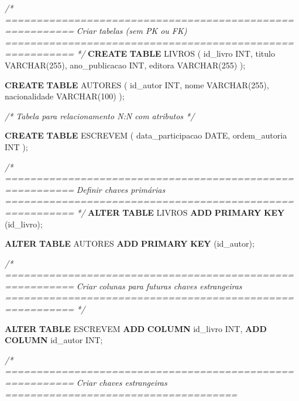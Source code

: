 \documentclass[
]{book}
\newenvironment{Shaded}{\begin{snugshade}}{\end{snugshade}}
\newcommand{\CommentTok}[1]{\textcolor[rgb]{0.56,0.35,0.01}{\textit{#1}}}
\newcommand{\DataTypeTok}[1]{\textcolor[rgb]{0.13,0.29,0.53}{#1}}
\newcommand{\DecValTok}[1]{\textcolor[rgb]{0.00,0.00,0.81}{#1}}
\newcommand{\KeywordTok}[1]{\textcolor[rgb]{0.13,0.29,0.53}{\textbf{#1}}}
\newcommand{\NormalTok}[1]{#1}
\begin{document}
\begin{Shaded}
\begin{Highlighting}[]

\CommentTok{/* =========================================================}
\CommentTok{   Criar tabelas (sem PK ou FK)}
\CommentTok{   ========================================================= */}
\KeywordTok{CREATE} \KeywordTok{TABLE}\NormalTok{ LIVROS }
\NormalTok{(}
\NormalTok{    id\_livro }\DataTypeTok{INT}\NormalTok{,}
\NormalTok{    titulo }\DataTypeTok{VARCHAR}\NormalTok{(}\DecValTok{255}\NormalTok{),}
\NormalTok{    ano\_publicacao }\DataTypeTok{INT}\NormalTok{,}
\NormalTok{    editora }\DataTypeTok{VARCHAR}\NormalTok{(}\DecValTok{255}\NormalTok{)}
\NormalTok{);}

\KeywordTok{CREATE} \KeywordTok{TABLE}\NormalTok{ AUTORES }
\NormalTok{(}
\NormalTok{    id\_autor }\DataTypeTok{INT}\NormalTok{,}
\NormalTok{    nome }\DataTypeTok{VARCHAR}\NormalTok{(}\DecValTok{255}\NormalTok{),}
\NormalTok{    nacionalidade }\DataTypeTok{VARCHAR}\NormalTok{(}\DecValTok{100}\NormalTok{)}
\NormalTok{);}

\CommentTok{/* Tabela para relacionamento N:N com atributos */}

\KeywordTok{CREATE} \KeywordTok{TABLE}\NormalTok{ ESCREVEM }
\NormalTok{(}
\NormalTok{    data\_participacao }\DataTypeTok{DATE}\NormalTok{,}
\NormalTok{    ordem\_autoria }\DataTypeTok{INT}
\NormalTok{);}

\CommentTok{/* =========================================================}
\CommentTok{   Definir chaves primárias}
\CommentTok{   ========================================================= */}
\KeywordTok{ALTER} \KeywordTok{TABLE}\NormalTok{ LIVROS }\KeywordTok{ADD} \KeywordTok{PRIMARY} \KeywordTok{KEY}\NormalTok{ (id\_livro);}

\KeywordTok{ALTER} \KeywordTok{TABLE}\NormalTok{ AUTORES }\KeywordTok{ADD} \KeywordTok{PRIMARY} \KeywordTok{KEY}\NormalTok{ (id\_autor);}

\CommentTok{/* =========================================================}
\CommentTok{   Criar colunas para futuras chaves estrangeiras}
\CommentTok{   ========================================================= */}

\KeywordTok{ALTER} \KeywordTok{TABLE}\NormalTok{ ESCREVEM }\KeywordTok{ADD} \KeywordTok{COLUMN}\NormalTok{ id\_livro }\DataTypeTok{INT}\NormalTok{, }\KeywordTok{ADD} \KeywordTok{COLUMN}\NormalTok{ id\_autor }\DataTypeTok{INT}\NormalTok{;}

\CommentTok{/* =========================================================}
\CommentTok{   Criar chaves estrangeiras}
\CommentTok{   =====================================}


\end{Highlighting}
\end{Shaded}
\end{document}
